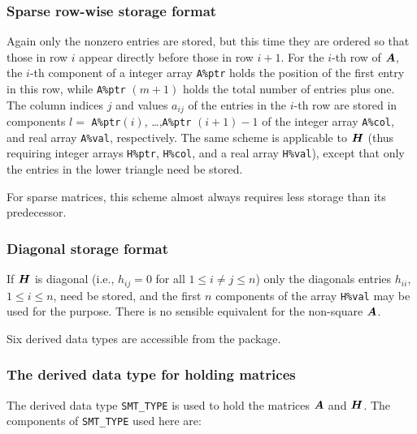 \documentclass{galahad}
\begin{document}
\subsubsection{Sparse row-wise storage format}\label{rowwise}
Again only the nonzero entries are stored, but this time
they are ordered so that those in row $i$ appear directly before those
in row $i+1$. For the $i$-th row of ${\bm{A}}$, the $i$-th component of a 
integer array {\tt A\%ptr} holds the position of the first entry in this row,
while {\tt A\%ptr} $(m+1)$ holds the total number of entries plus one.
The column indices $j$ and values $a_{ij}$ of the entries in the $i$-th row 
are stored in components 
$l =$ {\tt A\%ptr}$(i)$, \ldots ,{\tt A\%ptr} $(i+1)-1$ of the 
integer array {\tt A\%col}, and real array {\tt A\%val}, respectively. 
The same scheme is applicable to
${\bm{H}}$ (thus requiring integer arrays {\tt H\%ptr}, {\tt H\%col}, and 
a real array {\tt H\%val}),
except that only the entries in the lower triangle need be stored.

For sparse matrices, this scheme almost always requires less storage than 
its predecessor.

\subsubsection{Diagonal storage format}\label{diagonal}
If ${\bm{H}}$ is diagonal (i.e., $h_{ij} = 0$ for all $1 \leq i \neq j \leq n$)
only the diagonals entries $h_{ii}$, $1 \leq i \leq n$,  need be stored,
and the first $n$ components of the array {\tt H\%val} may be used for 
the purpose. There is no sensible equivalent for the non-square ${\bm{A}}$.








\galtypes
Six derived data types are accessible from the package.


\subsubsection{The derived data type for holding matrices}\label{typesmt}
The derived data type {\tt SMT\_TYPE} is used to hold the matrices ${\bm{A}}$
and ${\bm{H}}$. The components of {\tt SMT\_TYPE} used here are:
\end{document}
